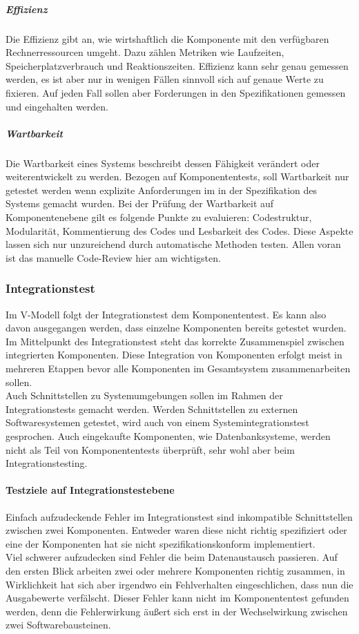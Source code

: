 \subparagraph{Effizienz} Die Effizienz gibt an, wie wirtshaftlich die Komponente mit den verfügbaren Rechnerressourcen umgeht\cite{spillner_basiswissen_2012}. Dazu zählen Metriken wie Laufzeiten, Speicherplatzverbrauch und Reaktionszeiten. Effizienz kann sehr genau gemessen werden, es ist aber nur in wenigen Fällen sinnvoll sich auf genaue Werte zu fixieren. Auf jeden Fall sollen aber Forderungen in den Spezifikationen gemessen und eingehalten werden.

\subparagraph{Wartbarkeit}
Die Wartbarkeit eines Systems beschreibt dessen Fähigkeit verändert oder weiterentwickelt zu werden. Bezogen auf Komponententests, soll Wartbarkeit nur getestet werden wenn explizite Anforderungen im in der Spezifikation des Systems gemacht wurden. Bei der Prüfung der Wartbarkeit auf Komponentenebene gilt es folgende Punkte zu evaluieren: Codestruktur, Modularität, Kommentierung des Codes und Lesbarkeit des Codes. Diese Aspekte lassen sich nur unzureichend durch automatische Methoden testen. Allen voran ist das manuelle Code-Review hier am wichtigsten\cite{spillner_basiswissen_2012}.

\subsubsection{Integrationstest}
Im V-Modell folgt der Integrationstest dem Komponententest. Es kann also davon ausgegangen werden, dass einzelne Komponenten bereits getestet wurden. Im Mittelpunkt des Integrationstest steht das korrekte Zusammenspiel zwischen integrierten Komponenten. Diese Integration von Komponenten erfolgt meist in mehreren Etappen bevor alle Komponenten im Gesamtsystem zusammenarbeiten sollen.\\
Auch Schnittstellen zu Systemumgebungen sollen im Rahmen der Integrationstests gemacht werden. Werden Schnittstellen zu externen Softwaresystemen getestet, wird auch von einem Systemintegrationstest gesprochen\cite{spillner_basiswissen_2012}. Auch eingekaufte Komponenten, wie Datenbanksysteme, werden nicht als Teil von Komponententests überprüft, sehr wohl aber beim Integrationstesting.

\paragraph{Testziele auf Integrationstestebene}
Einfach aufzudeckende Fehler im Integrationstest sind inkompatible Schnittstellen zwischen zwei Komponenten. Entweder waren diese nicht richtig spezifiziert oder eine der Komponenten hat sie nicht spezifikationskonform implementiert.\\
Viel schwerer aufzudecken sind Fehler die beim Datenaustausch passieren. Auf den ersten Blick arbeiten zwei oder mehrere Komponenten richtig zusammen, in Wirklichkeit hat sich aber irgendwo ein Fehlverhalten eingeschlichen, dass nun die Ausgabewerte verfälscht. Dieser Fehler kann nicht im Komponententest gefunden werden, denn die Fehlerwirkung äußert sich erst in der Wechselwirkung zwischen zwei Softwarebausteinen\cite{spillner_basiswissen_2012}.


